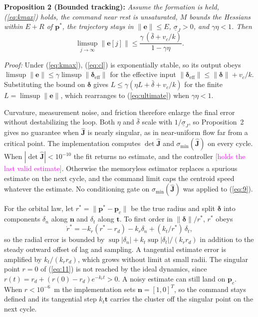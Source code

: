 \documentclass[lettersize,journal]{IEEEtran}
\newcommand{\open}[1]{\textcolor{magenta}{[#1]}}     %
\begin{document}
\smallskip
\noindent\textbf{Proposition 2 (Bounded tracking):} \textit{Assume the formation is held, (\ref{eq:kmax}) holds, the command near rest is unsaturated, $M$ bounds the Hessians within $E + R$ of $\mathbf{p}^*$, the trajectory stays in $\|\mathbf{e}\| \le E$, $\underline{\sigma}_J > 0$, and $\gamma\eta < 1$. Then}
\begin{equation}\label{eq:ultimate}
\limsup_{j\to\infty} \|\mathbf{e}[j]\| \le \frac{\gamma\,(\bar{\delta} + v_c/k)}{1 - \gamma\eta}.
\end{equation}

\noindent\textit{Proof:} Under (\ref{eq:kmax}), (\ref{eq:cl}) is exponentially stable, so its output obeys $\limsup\|\mathbf{e}\| \le \gamma\limsup\|\boldsymbol{\delta}_{\mathrm{eff}}\|$ for the effective input $\|\boldsymbol{\delta}_{\mathrm{eff}}\| \le \|\boldsymbol{\delta}\| + v_c/k$. Substituting the bound on $\boldsymbol{\delta}$ gives $L \le \gamma(\eta L + \bar{\delta} + v_c/k)$ for the finite $L = \limsup\|\mathbf{e}\|$, which rearranges to (\ref{eq:ultimate}) when $\gamma\eta < 1$. \hfill\IEEEQED

\smallskip
Curvature, measurement noise, and friction therefore enlarge the final error without destabilizing the loop. Both $\eta$ and $\bar{\delta}$ scale with $1/\underline{\sigma}_J$, so Proposition~2 gives no guarantee when $\hat{\mathbf{J}}$ is nearly singular, as in near-uniform flow far from a critical point. The implementation computes $\det\hat{\mathbf{J}}$ and $\sigma_{\min}(\hat{\mathbf{J}})$ on every cycle. When $|\det\hat{\mathbf{J}}| < 10^{-10}$ the fit returns no estimate, and the controller \open{holds the last valid estimate}. %
Otherwise the memoryless estimator replaces a spurious estimate on the next cycle, and the command limit caps the centroid speed whatever the estimate. No conditioning gate on $\sigma_{\min}(\hat{\mathbf{J}})$ was applied to (\ref{eq:9}).

For the orbital law, let $r^* = \|\mathbf{p}^* - \mathbf{p}_c\|$ be the true radius and split $\boldsymbol{\delta}$ into components $\delta_n$ along $\mathbf{n}$ and $\delta_t$ along $\mathbf{t}$. To first order in $\|\boldsymbol{\delta}\|/r^*$, $r^*$ obeys
\begin{equation}\label{eq:orbit_iss}
\dot{r}^* = -k_r(r^* - r_d) - k_r\delta_n + (k_t/r^*)\,\delta_t,
\end{equation}
so the radial error is bounded by $\sup|\delta_n| + k_t\sup|\delta_t|/(k_r r_d)$ in addition to the steady outward offset of lag and sampling. A tangential estimate error is amplified by $k_t/(k_r r_d)$, which grows without limit at small radii. The singular point $r = 0$ of (\ref{eq:11}) is not reached by the ideal dynamics, since $r(t) = r_d + (r(0) - r_d)e^{-k_r t} > 0$. A noisy estimate can still land on $\mathbf{p}_c$. When $r < 10^{-6}$~m the implementation sets $\mathbf{n} = [1, 0]^T$, so the command stays defined and its tangential step $k_t\mathbf{t}$ carries the cluster off the singular point on the next cycle.
\end{document}
